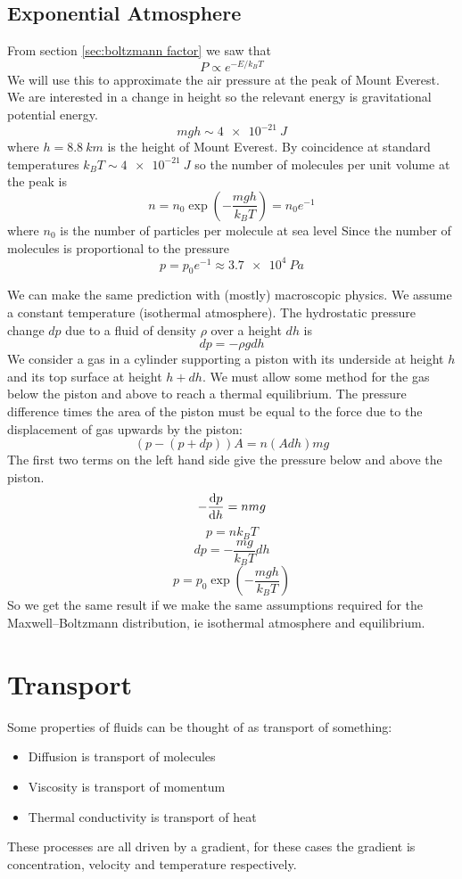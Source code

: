 \documentclass{article}
\begin{document}
    \subsection{Exponential Atmosphere}
    From section \ref{sec:boltzmann factor} we saw that
    \[P \propto e^{-E/k_BT}\]
    We will use this to approximate the air pressure at the peak of Mount Everest.
    We are interested in a change in height so the relevant energy is gravitational potential energy.
    \[mgh\sim \SI{4e-21}{J}\]
    where \(h = \SI{8.8}{km}\) is the height of Mount Everest.
    By coincidence at standard temperatures \(k_BT \sim \SI{4e-21}{J}\) so the number of molecules per unit volume at the peak is
    \[n = n_0\exp\left(-\frac{mgh}{k_BT}\right) = n_0e^{-1}\]
    where \(n_0\) is the number of particles per molecule at sea level
    Since the number of molecules is proportional to the pressure
    \[p = p_0e^{-1} \approx \SI{3.7e4}{Pa}\]
    
    We can make the same prediction with (mostly) macroscopic physics.
    We assume a constant temperature (isothermal atmosphere).
    The hydrostatic pressure change \(dp\) due to a fluid of density \(\rho\) over a height \(dh\) is
    \[dp = -\rho g dh\]
    We consider a gas in a cylinder supporting a piston with its underside at height \(h\) and its top surface at height \(h + dh\).
    We must allow some method for the gas below the piston and above to reach a thermal equilibrium.
    The pressure difference times the area of the piston must be equal to the force due to the displacement of gas upwards by the piston:
    \[(p - (p + dp))A = n(Adh)mg\]
    The first two terms on the left hand side give the pressure below and above the piston.
    \[-\dv{p}{h} = nmg\]
    \[p = nk_BT\]
    \[dp = -\frac{mg}{k_BT}dh\]
    \[p = p_0\exp\left(-\frac{mgh}{k_BT}\right)\]
    So we get the same result if we make the same assumptions required for the Maxwell--Boltzmann distribution, ie isothermal atmosphere and equilibrium.
    
    \section{Transport}
    Some properties of fluids can be thought of as transport of something:
    \begin{itemize}
        \item Diffusion is transport of molecules
        \item Viscosity is transport of momentum
        \item Thermal conductivity is transport of heat
    \end{itemize}
    These processes are all driven by a gradient, for these cases the gradient is concentration, velocity and temperature respectively.
    
\end{document}
